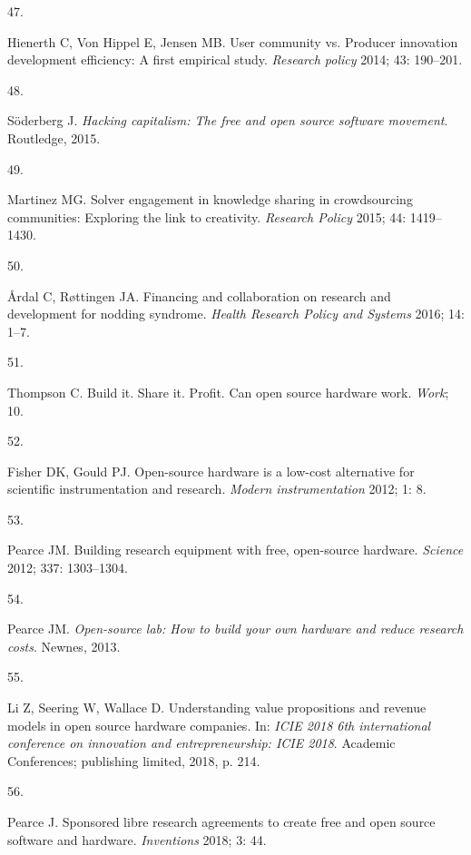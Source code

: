 \documentclass[
  11pt,
  a4paperpaper,
  onecolumn]{article}
\newlength{\cslhangindent}
\newlength{\csllabelwidth}
\newlength{\cslentryspacingunit} %
\newenvironment{CSLReferences}[2] %
 {%
  \setlength{\parindent}{0pt}
  \ifodd #1
  \let\oldpar\par
  \def\par{\hangindent=\cslhangindent\oldpar}
  \fi
  \setlength{\parskip}{#2\cslentryspacingunit}
 }%
 {}
\newcommand{\CSLLeftMargin}[1]{\parbox[t]{\csllabelwidth}{#1}}
\newcommand{\CSLRightInline}[1]{\parbox[t]{\linewidth - \csllabelwidth}{#1}\break}
\begin{document}
\begin{CSLReferences}{0}{0}
\leavevmode{}%
\CSLLeftMargin{47. }%
\CSLRightInline{Hienerth C, Von Hippel E, Jensen MB. User community vs.
Producer innovation development efficiency: A first empirical study.
\emph{Research policy} 2014; 43: 190--201.}

\leavevmode{}%
\CSLLeftMargin{48. }%
\CSLRightInline{Söderberg J. \emph{Hacking capitalism: The free and open
source software movement}. Routledge, 2015.}

\leavevmode{}%
\CSLLeftMargin{49. }%
\CSLRightInline{Martinez MG. Solver engagement in knowledge sharing in
crowdsourcing communities: Exploring the link to creativity.
\emph{Research Policy} 2015; 44: 1419--1430.}

\leavevmode{}%
\CSLLeftMargin{50. }%
\CSLRightInline{Årdal C, Røttingen JA. {Financing and collaboration on
research and development for nodding syndrome}. \emph{Health Research
Policy and Systems} 2016; 14: 1--7.}

\leavevmode{}%
\CSLLeftMargin{51. }%
\CSLRightInline{Thompson C. Build it. Share it. Profit. Can open source
hardware work. \emph{Work}; 10.}

\leavevmode{}%
\CSLLeftMargin{52. }%
\CSLRightInline{Fisher DK, Gould PJ. Open-source hardware is a low-cost
alternative for scientific instrumentation and research. \emph{Modern
instrumentation} 2012; 1: 8.}

\leavevmode{}%
\CSLLeftMargin{53. }%
\CSLRightInline{Pearce JM. Building research equipment with free,
open-source hardware. \emph{Science} 2012; 337: 1303--1304.}

\leavevmode{}%
\CSLLeftMargin{54. }%
\CSLRightInline{Pearce JM. \emph{Open-source lab: How to build your own
hardware and reduce research costs}. Newnes, 2013.}

\leavevmode{}%
\CSLLeftMargin{55. }%
\CSLRightInline{Li Z, Seering W, Wallace D. Understanding value
propositions and revenue models in open source hardware companies. In:
\emph{ICIE 2018 6th international conference on innovation and
entrepreneurship: ICIE 2018}. Academic Conferences; publishing limited,
2018, p. 214.}

\leavevmode{}%
\CSLLeftMargin{56. }%
\CSLRightInline{Pearce J. Sponsored libre research agreements to create
free and open source software and hardware. \emph{Inventions} 2018; 3:
44.}


\end{CSLReferences}
\end{document}
